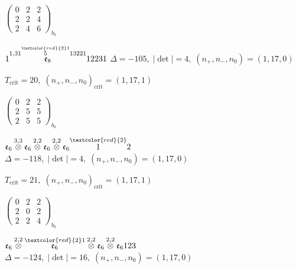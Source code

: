 \documentclass[10pt]{article}
\begin{document}
\hspace{2em}$\left(\begin{smallmatrix}0 & 2 & 2 \\ 2 & 2 & 4 \\ 2 & 4 & 6\end{smallmatrix}\right)_{\!b_0}$

\smallskip

$1\overset{1,31\overset{\textcolor{red}{2}1}{5}13221}{\mathfrak{e}_8}12231$ \quad $\Delta=-105,\; |\det|=4,\; (n_+,n_-,n_0)=(1,17,0)$

\hspace{1em}$T_{\text{crit}}=20,\; (n_+,n_-,n_0)_{\text{crit}}=(1,17,1)$

\hspace{2em}$\left(\begin{smallmatrix}0 & 2 & 2 \\ 2 & 5 & 5 \\ 2 & 5 & 5\end{smallmatrix}\right)_{\!b_0}$

\smallskip

$\mathfrak{e}_6\overset{3,3}{\otimes}\mathfrak{e}_6\overset{2,2}{\otimes}\mathfrak{e}_6\overset{2,2}{\otimes}\mathfrak{e}_6\overset{\textcolor{red}{2}}{1}2$ \quad $\Delta=-118,\; |\det|=4,\; (n_+,n_-,n_0)=(1,17,0)$

\hspace{1em}$T_{\text{crit}}=21,\; (n_+,n_-,n_0)_{\text{crit}}=(1,17,1)$

\hspace{2em}$\left(\begin{smallmatrix}0 & 2 & 2 \\ 2 & 0 & 2 \\ 2 & 2 & 4\end{smallmatrix}\right)_{\!b_0}$

\smallskip

$\mathfrak{e}_6\overset{2,2}{\otimes}\overset{\textcolor{red}{2}1}{\mathfrak{e}_6}\overset{2,2}{\otimes}\mathfrak{e}_6\overset{2,2}{\otimes}\mathfrak{e}_6123$ \quad $\Delta=-124,\; |\det|=16,\; (n_+,n_-,n_0)=(1,17,0)$
\end{document}
